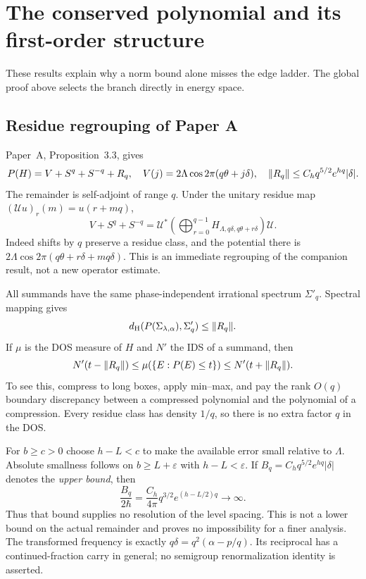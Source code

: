 \section{The conserved polynomial and its first-order structure}\label{app:remainder}
These results explain why a norm bound alone misses the edge ladder. The global proof above selects the branch directly in energy space.

\subsection{Residue regrouping of Paper A}
Paper~A, Proposition~3.3, gives
\begin{equation}\label{eq:polyidentity}
 P(H)=V+S^q+S^{-q}+R_q,\quad
 V(j)=2\Lambda\cos2\pi(q\theta+j\delta),\quad
 \lVert R_q\rVert\le C_hq^{5/2}e^{hq}|\delta|.
\end{equation}
The remainder is self-adjoint of range $q$. Under the unitary residue map
$(\mathcal Uu)_r(m)=u(r+mq)$,
\begin{equation}\label{eq:regroup}
 V+S^q+S^{-q}
 =\mathcal U^*\left(\bigoplus_{r=0}^{q-1}
 H_{\Lambda,q\delta,q\theta+r\delta}\right)\mathcal U.
\end{equation}
Indeed shifts by $q$ preserve a residue class, and the potential there is
$2\Lambda\cos2\pi(q\theta+r\delta+mq\delta)$.
This is an immediate regrouping of the companion result, not a new operator estimate.

All summands have the same phase-independent irrational spectrum $\Sigma'_q$. Spectral mapping gives
\[
 d_{\rm H}(P(\Sigma_{\lambda,\alpha}),\Sigma'_q)\le\lVert R_q\rVert.
\]
If $\mu$ is the DOS measure of $H$ and $N'$ the IDS of a summand, then
\[
 N'(t-\lVert R_q\rVert)\le\mu(\{E:P(E)\le t\})
                       \le N'(t+\lVert R_q\rVert).
\]
To see this, compress to long boxes, apply min--max, and pay the rank $O(q)$ boundary discrepancy between a compressed polynomial and the polynomial of a compression. Every residue class has density $1/q$, so there is no extra factor $q$ in the DOS.

For $b\ge c>0$ choose $h-L<c$ to make the available error small relative to $\Lambda$. Absolute smallness follows on $b\ge L+\varepsilon$ with $h-L<\varepsilon$. If $B_q=C_hq^{5/2}e^{hq}|\delta|$ denotes the \emph{upper bound}, then
\[
 \frac{B_q}{2\hbar}=\frac{C_h}{4\pi}q^{3/2}e^{(h-L/2)q}\to\infty.
\]
Thus that bound supplies no resolution of the level spacing. This is not a lower bound on the actual remainder and proves no impossibility for a finer analysis. The transformed frequency is exactly $q\delta=q^2(\alpha-p/q)$. Its reciprocal has a continued-fraction carry in general; no semigroup renormalization identity is asserted.

